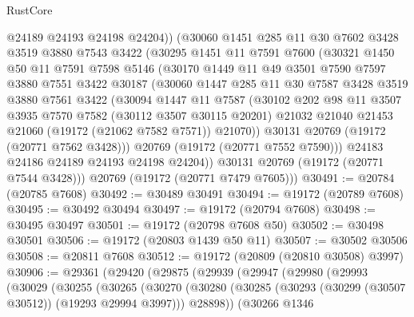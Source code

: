 \begin{lexlean}{RustCore}
\begin{coremodule}
          @24189
          @24193
          @24198
          @24204))
      (@30060
        @1451
        @285
        @11
        @30
        @7602
        @3428
        @3519
        @3880
        @7543
        @3422
        (@30295
          @1451
          @11
          @7591
          @7600
          (@30321
            @1450
            @50
            @11
            @7591
            @7598
            @5146
            (@30170
              @1449
              @11
              @49
              @3501
              @7590
              @7597
              @3880
              @7551
              @3422
              @30187
              (@30060
                @1447
                @285
                @11
                @30
                @7587
                @3428
                @3519
                @3880
                @7561
                @3422
                (@30094
                  @1447
                  @11
                  @7587
                  (@30102
                    @202
                    @98
                    @11
                    @3507
                    @3935
                    @7570
                    @7582
                    (@30112 @3507 @30115 @20201)
                    @21032
                    @21040
                    @21453
                    @21060
                    (@19172 (@21062 @7582 @7571))
                    @21070))
                @30131
                @20769
                (@19172 (@20771 @7562 @3428)))
              @20769
              (@19172 (@20771 @7552 @7590)))
            @24183
            @24186
            @24189
            @24193
            @24198
            @24204))
        @30131
        @20769
        (@19172 (@20771 @7544 @3428)))
      @20769
      (@19172 (@20771 @7479 @7605)))
@30491 := @20784 (@20785 @7608)
@30492 := @30489 @30491
@30494 := @19172 (@20789 @7608)
@30495 := @30492 @30494
@30497 := @19172 (@20794 @7608)
@30498 := @30495 @30497
@30501 := @19172 (@20798 @7608 @50)
@30502 := @30498 @30501
@30506 := @19172 (@20803 @1439 @50 @11)
@30507 := @30502 @30506
@30508 := @20811 @7608
@30512 := @19172 (@20809 (@20810 @30508) @3997)
@30906 := @29361
    (@29420
      (@29875
        (@29939
          (@29947
            (@29980
              (@29993
                (@30029
                  (@30255
                    (@30265
                      (@30270
                        (@30280
                          (@30285 (@30293 (@30299 (@30507 @30512)) (@19293 @29994 @3997)))
                          @28898))
                      (@30266
                        @1346

\end{coremodule}
\end{lexlean}
